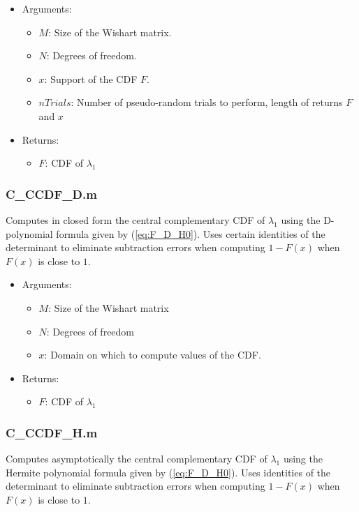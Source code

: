 \begin{itemize}
\item Arguments:
\begin{itemize}
\item $M$: Size of the Wishart matrix.
\item $N$: Degrees of freedom.
\item $x$: Support of the CDF $F$.
\item $nTrials$: Number of pseudo-random trials to perform, length of returns $F$ and $x$
\end{itemize}
\item Returns:
\begin{itemize}
\item $F$: CDF of $\lambda_1$
\end{itemize}
\end{itemize}



\subsubsection*{C\_CCDF\_D.m}

Computes in closed form the central complementary CDF of $\lambda_1$ using the D-polynomial formula given by (\ref{eq:F_D_H0}). Uses certain identities of the determinant to eliminate subtraction errors when computing $1-F(x)$ when $F(x)$ is close to $1$.

\begin{itemize}
\item Arguments:
\begin{itemize}
\item $M$: Size of the Wishart matrix
\item $N$: Degrees of freedom
\item $x$: Domain on which to compute values of the CDF.
\end{itemize}
\item Returns:
\begin{itemize}
\item $F$: CDF of $\lambda_1$
\end{itemize}
\end{itemize}

\subsubsection*{C\_CCDF\_H.m}

Computes asymptotically the central complementary CDF of $\lambda_1$ using the Hermite polynomial formula given by (\ref{eq:F_D_H0}). Uses identities of the determinant to eliminate subtraction errors when computing $1-F(x)$ when $F(x)$ is close to $1$.

